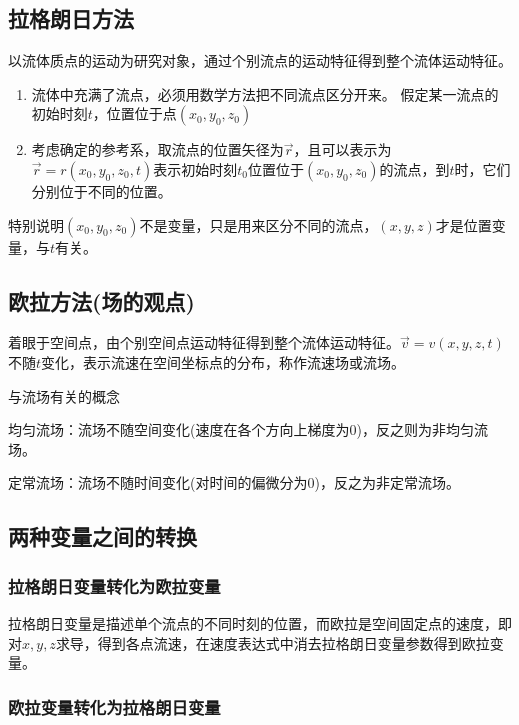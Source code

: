 \documentclass[a4paper,oneside]{ctexbook}
\begin{document}
\subsection{拉格朗日方法}

以流体质点的运动为研究对象，通过个别流点的运动特征得到整个流体运动特征。
\begin{enumerate}
    \item 流体中充满了流点，必须用数学方法把不同流点区分开来。 假定某一流点的初始时刻\(t\)，位置位于点\((x_0,y_0,z_0)\)
    \item 考虑确定的参考系，取流点的位置矢径为\(\overrightarrow{r}\)，且可以表示为\(\overrightarrow{r}=r(x_0,y_0,z_0,t)\)表示初始时刻\(t_0\)位置位于\((x_0,y_0,z_0)\)的流点，到\(t\)时，它们分别位于不同的位置。
\end{enumerate}

特别说明\((x_0,y_0,z_0)\)不是变量，只是用来区分不同的流点，\((x,y,z)\)才是位置变量，与\(t\)有关。

\subsection{欧拉方法(场的观点)}

着眼于空间点，由个别空间点运动特征得到整个流体运动特征。\(\overrightarrow{v}=v(x,y,z,t)\)不随\(t\)变化，表示流速在空间坐标点的分布，称作流速场或流场。

与流场有关的概念 

均匀流场：流场不随空间变化(速度在各个方向上梯度为0)，反之则为非均匀流场。

定常流场：流场不随时间变化(对时间的偏微分为0)，反之为非定常流场。

\subsection{两种变量之间的转换}

\subsubsection{拉格朗日变量转化为欧拉变量}

拉格朗日变量是描述单个流点的不同时刻的位置，而欧拉是空间固定点的速度，即对\(x,y,z\)求导，得到各点流速，在速度表达式中消去拉格朗日变量参数得到欧拉变量。

\subsubsection{欧拉变量转化为拉格朗日变量}
\end{document}
